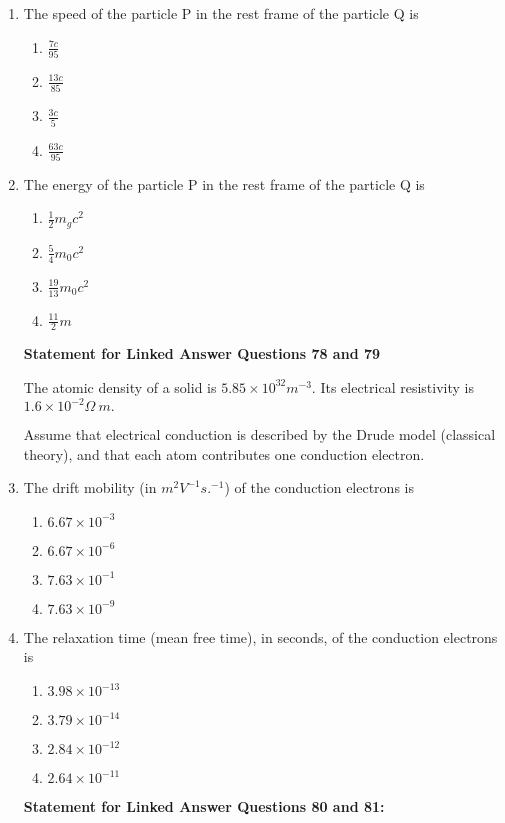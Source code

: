 \documentclass[journal]{IEEEtran}
\begin{document}
\begin{enumerate}[start=69]
\item The speed of the particle P in the rest frame of the particle Q is
\begin{multicols}{4}
\begin{enumerate}
\item $\frac{7c}{95}$
\item $\frac{13c}{85}$
\item $\frac{3c}{5}$
\item $\frac{63c}{95}$
\end{enumerate}
\end{multicols}


\item The energy of the particle P in the rest frame of the particle Q is
\begin{multicols}{4}
\begin{enumerate}
\item $\frac{1}{2}m_{g}c^{2}$
\item $\frac{5}{4}m_{0}c^{2}$
\item $\frac{19}{13}m_{0}c^{2}$
\item $\frac{11}{2}m$
\end{enumerate}
\end{multicols}
    \textbf{Statement for Linked Answer Questions 78 and 79}

The atomic density of a solid is $5.85\times10^{32}m^{-3}$. Its electrical resistivity is $1.6\times10^{-2}\Omega~m.$

Assume that electrical conduction is described by the Drude model (classical theory), and that each atom contributes one conduction electron.


\item The drift mobility (in $m^{2}V^{-1}s.^{-1}$) of the conduction electrons is
\begin{multicols}{4}
\begin{enumerate}
\item $6.67\times10^{-3}$
\item $6.67\times10^{-6}$
\item $7.63\times10^{-1}$
\item $7.63\times10^{-9}$
\end{enumerate}
\end{multicols}

\item The relaxation time (mean free time), in seconds, of the conduction electrons is
\begin{multicols}{4}
\begin{enumerate}
\item $3.98\times10^{-13}$
\item $3.79\times10^{-14}$
\item $2.84\times10^{-12}$
\item $2.64\times10^{-11}$
\end{enumerate}
\end{multicols}
    \textbf{Statement for Linked Answer Questions 80 and 81:}


\end{enumerate}
\end{document}
